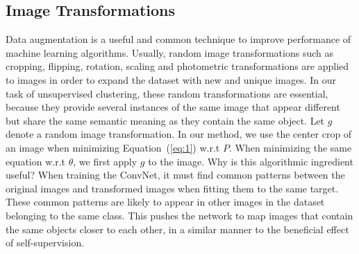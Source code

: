 \documentclass[a4paper,conference]{IEEEtran}
\begin{document}
\subsection{Image Transformations}
Data augmentation is a useful and common technique to improve performance of machine learning algorithms. Usually, random image transformations such as cropping, flipping, rotation, scaling and photometric transformations are applied to images in order to expand the dataset with new and unique images. In our task of unsupervised clustering, these random transformations are essential, because they provide several instances of the same image that appear different but share the same semantic meaning as they contain the same object. Let $g$ denote a random image transformation. In our method, we use the center crop of an image when minimizing Equation~(\ref{eq:1}) w.r.t $P$. When minimizing the same equation w.r.t $\theta$, we first apply $g$ to the image. Why is this algorithmic ingredient useful? When training the ConvNet, it must find common patterns between the original images and transformed images when fitting them to the same target. These common patterns are likely to appear in other images in the dataset belonging to the same class. This pushes the network to map images that contain the same objects closer to each other, in a similar manner to the beneficial effect of self-supervision.
\end{document}

